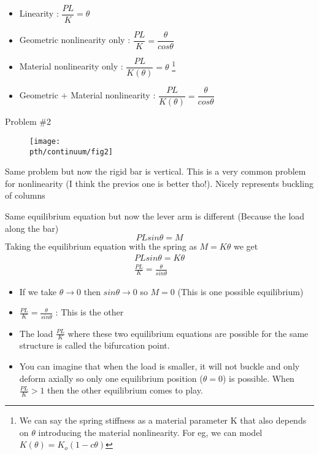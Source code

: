 	\begin{frame}
		\begin{itemize}
			\item Linearity : $\dfrac{PL}{K} = {\theta}$
			\item Geometric nonlinearity only : $\dfrac{PL}{K} = \dfrac{\theta}{cos \theta}$
			\item Material nonlinearity only : $\dfrac{PL}{K(\theta)} = {\theta}$ \footnote{We can say the spring stiffness as a material parameter K that also depends on $\theta$ introducing the material nonlinearity. For eg, we can model $K(\theta) = K_o(1-c\theta)$}
			\item Geometric + Material nonlinearity : $\dfrac{PL}{K(\theta)} = \dfrac{\theta}{cos \theta}$
		\end{itemize}
	\end{frame}

	\begin{frame}{Problem \#2}
		\begin{figure}
			\centering
			\texttt{[image: \\pth/continuum/fig2]}
			\caption{}
			\label{fig:fig1}
		\end{figure}
		Same problem but now the rigid bar is vertical. This is a very common problem for nonlinearity (I think the previos one is better tho!). Nicely represents buckling of columns
	\end{frame}

	\begin{frame}
		Same equilibrium equation but now the lever arm is different (Because the load along the bar)
		\begin{equation}
		PL sin \theta = M
		\end{equation}
		Taking the equilibrium equation with the spring as $ M = K \theta$ we get
		\begin{align*}
		PL sin \theta = K \theta \\
		\frac{PL}{K} = \frac{\theta}{sin \theta}
		\end{align*}
		\begin{itemize}
			\item If we take $\theta \rightarrow 0$ then $sin \theta \rightarrow 0$ so $M = 0$ (This is one possible equilibrium)
			\item	$\frac{PL}{K} = \frac{\theta}{sin \theta}$ : This is the other
			\item The load $\frac{PL}{K}$ where these two equilibrium equations are possible for the same structure is called the bifurcation point. 
			\item You can imagine that when the load is smaller, it will not buckle and only deform axially so only one equilibrium position ($\theta =0$) is possible. When $\frac{PL}{K}>1$ then the other equilibrium comes to play.
		\end{itemize}
	\end{frame}

